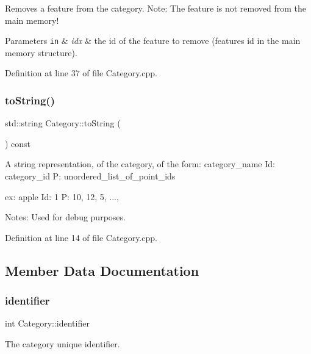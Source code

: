 Removes a feature from the category. Note\+: The feature is not removed from the main memory!


\begin{DoxyParams}[1]{Parameters}
\mbox{\tt in}  & {\em idx} & the id of the feature to remove (features\textquotesingle{} id in the main memory structure). \\
\hline
\end{DoxyParams}


Definition at line 37 of file Category.\+cpp.

\mbox{\label{class_category_a22e764bdb9b0d8d342c2971a1951a818}} 
\subsubsection{\texorpdfstring{to\+String()}{toString()}}
{\footnotesize\ttfamily std\+::string Category\+::to\+String (\begin{DoxyParamCaption}{ }\end{DoxyParamCaption}) const}

A string representation, of the category, of the form\+: category\+\_\+name Id\+: category\+\_\+id P\+: unordered\+\_\+list\+\_\+of\+\_\+point\+\_\+ids

ex\+: apple Id\+: 1 P\+: 10, 12, 5, ...,

Notes\+: Used for debug purposes. 

Definition at line 14 of file Category.\+cpp.



\subsection{Member Data Documentation}
\mbox{\label{class_category_a10f4f758d6942ef39ca6d1cc5dfb6369}} 
\subsubsection{\texorpdfstring{identifier}{identifier}}
{\footnotesize\ttfamily int Category\+::identifier\hspace{0.3cm}{\ttfamily [protected]}}

The category unique identifier. 

